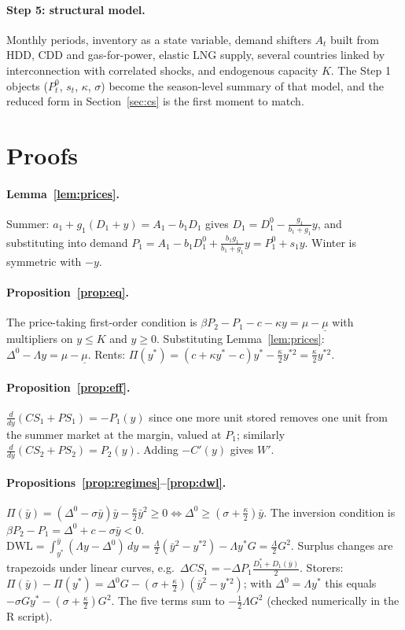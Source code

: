 \documentclass[11pt]{article}
\theoremstyle{definition}
\newcommand{\ybar}{\bar y}
\newcommand{\Dz}{\Delta^{0}}
\begin{document}
\paragraph{Step 5: structural model.} Monthly periods, inventory as a state variable, demand shifters $A_t$ built from HDD, CDD and
gas-for-power, elastic LNG supply, several countries linked by interconnection with correlated shocks, and endogenous capacity
$K$. The Step 1 objects ($P_t^0$, $s_t$, $\kappa$, $\sigma$) become the season-level summary of that model, and the reduced form in
Section~\ref{sec:cs} is the first moment to match.

\appendix
\section{Proofs}

\paragraph{Lemma~\ref{lem:prices}.} Summer: $a_1+g_1(D_1+y)=A_1-b_1D_1$ gives $D_1=D_1^0-\frac{g_1}{b_1+g_1}y$, and substituting
into demand $P_1=A_1-b_1D_1^0+\frac{b_1g_1}{b_1+g_1}y=P_1^0+s_1y$. Winter is symmetric with $-y$.

\paragraph{Proposition~\ref{prop:eq}.} The price-taking first-order condition is $\beta P_2-P_1-c-\kappa y=\mu-\underline\mu$ with
multipliers on $y\le K$ and $y\ge 0$. Substituting Lemma~\ref{lem:prices}: $\Dz-\Lambda y=\mu-\underline\mu$. Rents:
$\Pi(y^*)=(c+\kappa y^*-c)y^*-\frac\kappa2y^{*2}=\frac\kappa2y^{*2}$.

\paragraph{Proposition~\ref{prop:eff}.} $\frac{d}{dy}(CS_1+PS_1)=-P_1(y)$ since one more unit stored removes one unit from the summer
market at the margin, valued at $P_1$; similarly $\frac{d}{dy}(CS_2+PS_2)=P_2(y)$. Adding $-C'(y)$ gives $W'$.

\paragraph{Propositions~\ref{prop:regimes}--\ref{prop:dwl}.}
$\Pi(\ybar)=(\Dz-\sigma\ybar)\ybar-\frac\kappa2\ybar^2\ge0\iff\Dz\ge(\sigma+\frac\kappa2)\ybar$. The inversion condition is
$\beta P_2-P_1=\Dz+c-\sigma\ybar<0$. $\text{DWL}=\int_{y^*}^{\ybar}(\Lambda y-\Dz)\,dy=\frac\Lambda2(\ybar^2-y^{*2})-\Lambda y^*G=\frac\Lambda2G^2$.
Surplus changes are trapezoids under linear curves, e.g.\ $\Delta CS_1=-\Delta P_1\frac{D_1^*+D_1(\ybar)}{2}$. Storers:
$\Pi(\ybar)-\Pi(y^*)=\Dz G-(\sigma+\frac\kappa2)(\ybar^2-y^{*2})$; with $\Dz=\Lambda y^*$ this equals $-\sigma Gy^*-(\sigma+\frac\kappa2)G^2$. The
five terms sum to $-\frac12\Lambda G^2$ (checked numerically in the R script).
\end{document}
